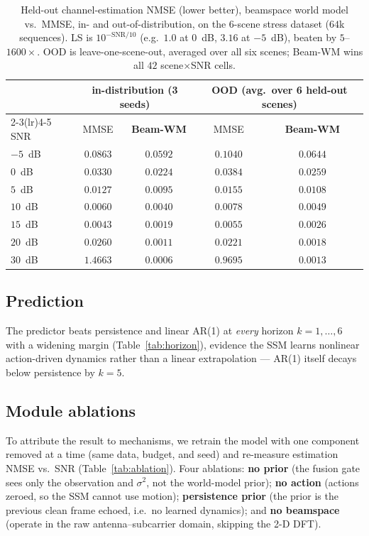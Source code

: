 \documentclass[11pt]{article}
\begin{document}
\begin{table}[h]
\centering
\begin{tabular}{lcc@{\hskip 1.2em}cc}
\toprule
& \multicolumn{2}{c}{in-distribution (3 seeds)} & \multicolumn{2}{c}{OOD (avg.\ over 6 held-out scenes)} \\
\cmidrule(lr){2-3}\cmidrule(lr){4-5}
SNR & MMSE & \textbf{Beam-WM} & MMSE & \textbf{Beam-WM} \\
\midrule
$-5$~dB & $0.0863$ & $\mathbf{0.0592}$ & $0.1040$ & $\mathbf{0.0644}$ \\
$0$~dB  & $0.0330$ & $\mathbf{0.0224}$ & $0.0384$ & $\mathbf{0.0259}$ \\
$5$~dB  & $0.0127$ & $\mathbf{0.0095}$ & $0.0155$ & $\mathbf{0.0108}$ \\
$10$~dB & $0.0060$ & $\mathbf{0.0040}$ & $0.0078$ & $\mathbf{0.0049}$ \\
$15$~dB & $0.0043$ & $\mathbf{0.0019}$ & $0.0055$ & $\mathbf{0.0026}$ \\
$20$~dB & $0.0260$ & $\mathbf{0.0011}$ & $0.0221$ & $\mathbf{0.0018}$ \\
$30$~dB & $1.4663$ & $\mathbf{0.0006}$ & $0.9695$ & $\mathbf{0.0013}$ \\
\bottomrule
\end{tabular}
\caption{Held-out channel-estimation NMSE (lower better), beamspace world model vs.\ MMSE, in-
and out-of-distribution, on the 6-scene stress dataset ($64$k sequences). LS is
$10^{-\mathrm{SNR}/10}$ (e.g.\ $1.0$ at $0$~dB, $3.16$ at $-5$~dB), beaten by $5$--$1600\times$.
OOD is leave-one-scene-out, averaged over all six scenes; Beam-WM wins all $42$ scene$\times$SNR cells.}
\label{tab:chanest}
\end{table}

\subsection{Prediction}
The predictor beats persistence and linear AR(1) at \emph{every} horizon $k=1,\dots,6$ with a widening
margin (Table~\ref{tab:horizon}), evidence the SSM learns nonlinear action-driven dynamics rather than
a linear extrapolation --- AR(1) itself decays below persistence by $k{=}5$.

\subsection{Module ablations}\label{sec:ablation}
To attribute the result to mechanisms, we retrain the model with one component removed at a time
(same data, budget, and seed) and re-measure estimation NMSE vs.\ SNR (Table~\ref{tab:ablation}).
Four ablations: \textbf{no prior} (the fusion gate sees only the observation and $\sigma^2$, not the
world-model prior); \textbf{no action} (actions zeroed, so the SSM cannot use motion);
\textbf{persistence prior} (the prior is the previous clean frame echoed, i.e.\ no learned dynamics);
and \textbf{no beamspace} (operate in the raw antenna--subcarrier domain, skipping the 2-D DFT).
\end{document}
